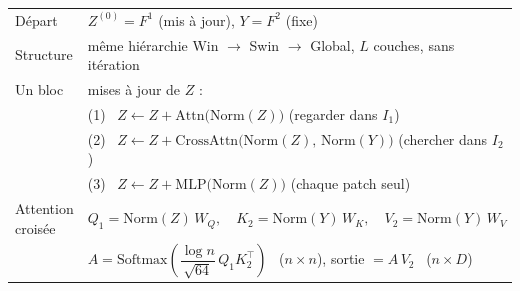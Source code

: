 \documentclass[border=8pt,varwidth=520pt]{standalone}
\begin{document}
\fontsize{13}{16}\selectfont
\begin{tabular}{@{}>{\raggedright\arraybackslash}p{92pt} >{\raggedright\arraybackslash}p{410pt}@{}}
Départ & $Z^{(0)} = F^1$ (mis à jour), \quad $Y = F^2$ (fixe) \\
Structure & même hiérarchie Win $\rightarrow$ Swin $\rightarrow$ Global, $L$ couches, sans itération \\
Un bloc & 3 mises à jour de $Z$ : \\
 & (1) \ $Z \leftarrow Z + \mathrm{Attn}\big(\mathrm{Norm}(Z)\big)$ \quad (regarder dans $I_1$) \\[-2pt]
 & (2) \ $Z \leftarrow Z + \mathrm{CrossAttn}\big(\mathrm{Norm}(Z),\, \mathrm{Norm}(Y)\big)$ \quad (chercher dans $I_2$) \\[-2pt]
 & (3) \ $Z \leftarrow Z + \mathrm{MLP}\big(\mathrm{Norm}(Z)\big)$ \quad (chaque patch seul) \\
Attention croisée & $Q_1 = \mathrm{Norm}(Z)\, W_Q, \quad K_2 = \mathrm{Norm}(Y)\, W_K, \quad V_2 = \mathrm{Norm}(Y)\, W_V$ \\
 & $A = \mathrm{Softmax}\!\left(\dfrac{\log n}{\sqrt{64}}\, Q_1 K_2^{\top}\right)$ \ ($n \times n$), \qquad sortie $= A\, V_2$ \ ($n \times D$) \\
\end{tabular}
\end{document}
